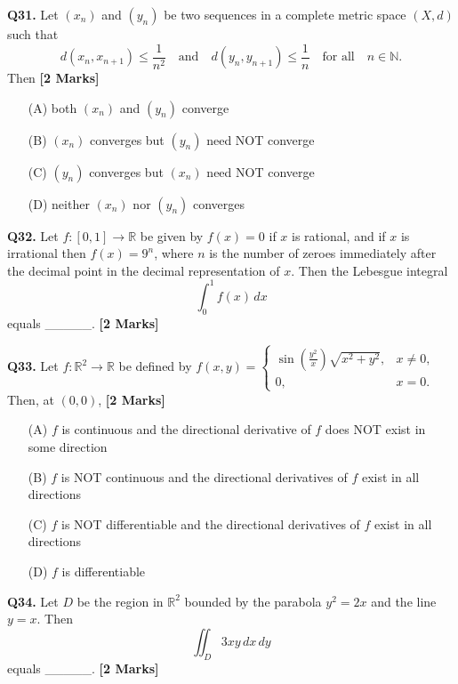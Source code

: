 \documentclass[11pt]{article}
\newcommand{\questionb}[2]{
    \noindent\textbf{Q#2.} #1 \hfill \textbf{[2 Marks]}
}
\begin{document}
\questionb{Let \( (x_n) \) and \( (y_n) \) be two sequences in a complete metric space \( (X, d) \) such that  
\[d(x_n, x_{n+1}) \leq \frac{1}{n^2} \quad \text{and} \quad d(y_n, y_{n+1}) \leq \frac{1}{n} \quad \text{for all} \quad n \in \mathbb{N}. \]  
Then}{31}
\begin{enumerate}
    \item[(A)] both \( (x_n) \) and \( (y_n) \) converge  
    \item[(B)] \( (x_n) \) converges but \( (y_n) \) need NOT converge  
    \item[(C)] \( (y_n) \) converges but \( (x_n) \) need NOT converge  
    \item[(D)] neither \( (x_n) \) nor \( (y_n) \) converges  
\end{enumerate}
\vspace{0.5cm}

\questionb{Let \( f: [0,1] \to \mathbb{R} \) be given by \( f(x) = 0 \) if \( x \) is rational, and if \( x \) is irrational then \( f(x) = 9^n \), where \( n \) is the number of zeroes immediately after the decimal point in the decimal representation of \( x \). Then the Lebesgue integral  
\[\int_0^1 f(x) \, dx\] equals \_\_\_\_\_.}{32}
\vspace{0.5cm}

\questionb{Let \( f : \mathbb{R}^2 \to \mathbb{R} \) be defined by \( f(x, y) = 
\begin{cases} 
\sin \left( \frac{y^2}{x} \right) \sqrt{x^2 + y^2}, & x \neq 0, \\ 
0, & x = 0.
\end{cases} \)
Then, at \((0, 0)\),}{33}
\begin{enumerate}
    \item[(A)] \( f \) is continuous and the directional derivative of \( f \) does NOT exist in some direction  
    \item[(B)] \( f \) is NOT continuous and the directional derivatives of \( f \) exist in all directions  
    \item[(C)] \( f \) is NOT differentiable and the directional derivatives of \( f \) exist in all directions  
    \item[(D)] \( f \) is differentiable  
\end{enumerate}
\vspace{0.5cm}

\questionb{Let \( D \) be the region in \( \mathbb{R}^2 \) bounded by the parabola \( y^2 = 2x \) and the line \( y = x \). Then  
\[\iint_D 3xy \, dx \, dy\] equals \_\_\_\_\_.}{34}
\vspace{0.5cm}
\end{document}
